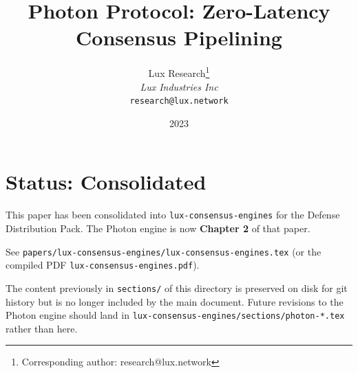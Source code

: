 \documentclass[11pt,a4paper]{article}
\title{\textbf{Photon Protocol: Zero-Latency Consensus Pipelining}}
\author{
Lux Research\thanks{Corresponding author: research@lux.network}\\
\textit{Lux Industries Inc}\\
\texttt{research@lux.network}
}
\date{2023}
\begin{document}
\luxcoverpage

\section*{Status: Consolidated}

This paper has been consolidated into \texttt{lux-consensus-engines} for the
Defense Distribution Pack. The Photon engine is now \textbf{Chapter 2} of that paper.

See \texttt{papers/lux-consensus-engines/lux-consensus-engines.tex} (or the
compiled PDF \texttt{lux-consensus-engines.pdf}).

The content previously in \texttt{sections/} of this directory is preserved on
disk for git history but is no longer included by the main document. Future
revisions to the Photon engine should land in
\texttt{lux-consensus-engines/sections/photon-*.tex} rather than here.
\end{document}
